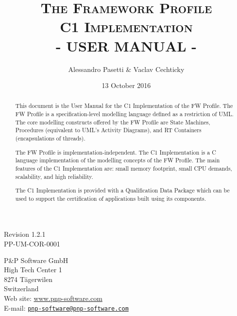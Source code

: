 \documentclass[a4paper,10pt]{article}
\title{\textsc{The Framework Profile} \\ \textsc{C1 Implementation} \\ \textsc{- USER MANUAL -}}
\author{Alessandro Pasetti \& Vaclav Cechticky}
\date{13 October 2016}
\begin{document}
\maketitle

\begin{center}
Revision 1.2.1 \\
PP-UM-COR-0001
\end{center}

\begin{center}
P\&P Software GmbH \\
High Tech Center 1 \\
8274 T\"{a}gerwilen \\
Switzerland \\
\vspace{2mm}
Web site: \url{www.pnp-software.com}\\
E-mail: \href{mailto:pnp-software@pnp-software.com}{\nolinkurl{pnp-software@pnp-software.com}} 
\end{center}

\begin{table}[ht]
\begin{center}
\begin{tabular}{p{11.7cm}}
\\
\hline
\end{tabular}
\end{center}
\end{table}
\begin{abstract}
This document is the User Manual for the C1 Implementation of the FW Profile. The FW Profile is a specification-level modelling language defined as a restriction of UML. The core modelling constructs offered by the FW Profile are State Machines, Procedures (equivalent to UML's Activity Diagrams), and RT Containers (encapsulations of threads).
\par
The FW Profile is implementation-independent. The C1 Implementation is a C language implementation of the modelling concepts of the FW Profile. The main features of the C1 Implementation are: small memory footprint, small CPU demands, scalability, and
high reliability.
\par 
The C1 Implementation is provided with a Qualification Data Package which can be used to support the certification of applications built using its components.
\end{abstract}
\begin{table}[ht]
\begin{center}
\begin{tabular}{p{11.7cm}}
\\
\hline
\end{tabular}
\end{center}
\end{table}
\end{document}
